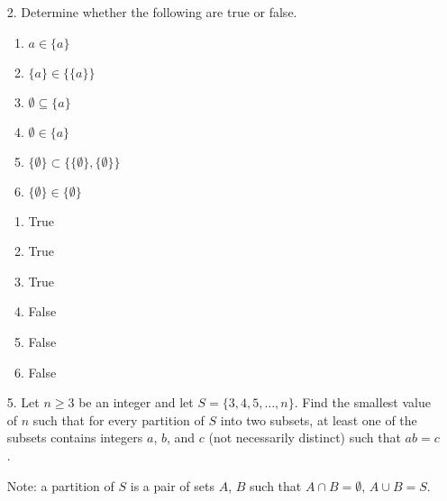 \begin{enumerate}
    \item[2.] Determine whether the following are true or false.
        \begin{enumerate}
            \item $a \in \{a\}$
            \item $\{a\} \in \{\{a\}\}$
            \item $\emptyset \subseteq \{a\}$
            \item $\emptyset \in \{a\}$
            \item $\{\emptyset\} \subset \{\{\emptyset\}, \{\emptyset\}\}$
            \item $\{\emptyset\} \in \{\emptyset\}$
        \end{enumerate}
    \begin{solutiondraft}
    \begin{enumerate}
        \item True
        \item True
        \item True
        \item False
        \item False
        \item False
    \end{enumerate}
    
    \end{solutiondraft}
    \begin{comment}
    \end{comment}



    
    \item[5.]Let $n \ge 3$ be an integer and let $S = \{3,4,5,\ldots,n\}$. Find the smallest value of $n$ such that for every partition of $S$ into two subsets, at least one of the subsets contains integers $a$, $b$, and $c$ (not necessarily distinct) such that $ab = c$.

    Note: a partition of $S$ is a pair of sets $A$, $B$ such that $A \cap B = \emptyset$, $A \cup B = S$. 
    \begin{solutiondraft}




\end{solutiondraft}
\end{enumerate}
